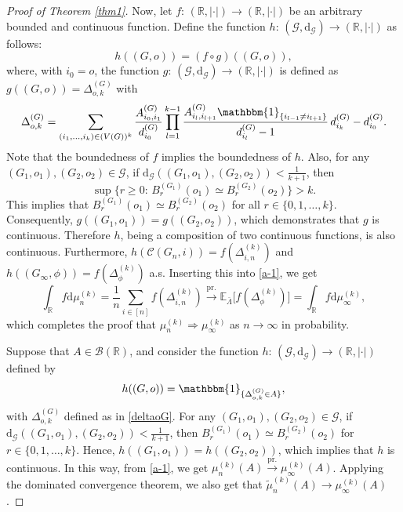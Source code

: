\documentclass[11pt]{article}
\numberwithin{equation}{section}
\theoremstyle{plain}
\newcommand{\R}{\mathbb R}
\newcommand{\dd}{\mathrm{d}}
\newcommand{\prob}{\overset{\mathrm{pr.}}{\longrightarrow}}
\newcommand{\weak}{\Longrightarrow}
\newcommand{\E}{\mathbb E}
\begin{document}
\begin{proof}[Proof of Theorem \ref{thm1}]
Now, let $f\colon\,(\R ,\vert\cdot\vert) \to (\R ,\vert\cdot\vert)$ be an arbitrary bounded and continuous function. Define the function $h\colon\,(\mathscr{G},\mathrm{d}_{\mathscr{G}}) \to (\R,\vert\cdot\vert)$ as follows:
\begin{equation}
\label{h}
h((G,o)) = (f\circ g)((G,o)),
\end{equation}
where, with $i_{0}=o$, the function $g\colon\,(\mathscr{G},\mathrm{d}_{\mathscr{G}}) \to (\R,\vert\cdot\vert)$ is defined as $g((G,o))=\Delta_{o,k}^{(G)}$ with
\begin{equation}
\label{deltaoG}
\Delta_{o,k}^{(G)}=\sum_{(i_{1},\ldots,i_{k})\in (V(G))^{k}}\frac{A^{(G)}_{i_{0},i_{1}}}{d^{(G)}_{i_0}}
\prod_{l=1}^{k-1}\frac{A^{(G)}_{i_{l},i_{l+1}}\mathbbm{1}_{\{i_{l-1}\neq i_{l+1}\}}}{d^{(G)}_{i_{l}}-1}\,
d^{(G)}_{i_{k}}-d^{(G)}_{i_{0}}.
\end{equation}
Note that the boundedness of $f$ implies the boundedness of $h$. Also, for any $(G_1,o_1),(G_2,o_2)\in\mathscr{G}$, if $ \mathrm{d}_{\mathscr{G}}((G_1,o_1),(G_2,o_2))<\frac{1}{k+1}$, then 
\begin{equation*}
\sup\big\{r\geq 0\colon\,B_{r}^{(G_1)}(o_1) \simeq B_{r}^{(G_2)}(o_2)\big\}>k.
\end{equation*}
This implies that $B_{r}^{(G_1)}(o_1) \simeq B_{r}^{(G_2)}(o_2)$ for all $r\in\{0,1,\ldots ,k\}$. Consequently, $g((G_1,o_1))=g((G_2,o_2))$, which demonstrates that $g$ is continuous. Therefore $h$, being a composition of two continuous functions, is also continuous. Furthermore, $h(\mathscr{C}(G_{n},i)) = f(\Delta_{i,n}^{(k)})$ and $h((G_{\infty},\phi))=f(\Delta_{\phi}^{(k)})$ a.s. Inserting this into \eqref{a-1}, we get
\begin{equation*}
\int_\R f\dd\mu_{n}^{(k)} =\dfrac{1}{n} \sum_{i \in [n]} f(\Delta_{i,n}^{(k)}) \prob 
\E_{\bar{\Lambda}}\big[f(\Delta_{\phi}^{(k)})\big]=\int_\R f\dd\mu^{(k)}_{\infty},
\end{equation*}
which completes the proof that $\mu_{n}^{(k)} \weak \mu^{(k)}_{\infty}$ as $n\to\infty$ in probability. 

Suppose that $A\in\mathcal{B}(\R)$, and consider the function $h\colon\,(\mathscr{G},\mathrm{d}_{\mathscr{G}}) \to (\R,\vert\cdot\vert)$ defined by 
\begin{align}
\label{hindicator}
h((G,o))=\mathbbm{1}_{\{\Delta_{o,k}^{(G)}\in A\}},
\end{align}
with $\Delta_{o,k}^{(G)}$ defined as in \eqref{deltaoG}. For any $(G_1,o_1),(G_2,o_2)\in\mathscr{G}$, if $ \mathrm{d}_{\mathscr{G}}((G_1,o_1),(G_2,o_2))<\frac{1}{k+1}$, then $B_{r}^{(G_1)}(o_1) \simeq B_{r}^{(G_2)}(o_2)$ for $r\in\{0,1,\ldots ,k\}$. Hence, $h((G_1,o_1))=h((G_2,o_2))$, which implies that $h$ is continuous. In this way, from \eqref{a-1}, we get $\mu_{n}^{(k)}(A)\prob\mu^{(k)}_{\infty}(A)$. Applying the dominated convergence theorem, we also get that $\tilde{\mu}_{n}^{(k)}(A)\to\mu^{(k)}_{\infty}(A)$.


\end{proof}
\end{document}
